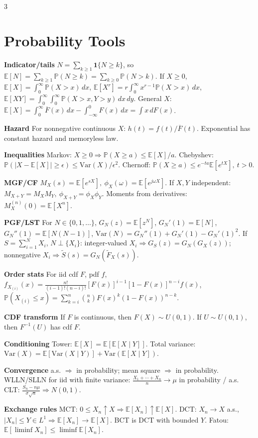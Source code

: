 \documentclass[a4paper,8pt,fleqn]{extarticle}
\newcommand{\E}{\mathbb{E}}
\newcommand{\PP}{\mathbb{P}}
\newcommand{\Var}{\mathrm{Var}}
\newcommand{\1}{\mathbf{1}}
\newcommand{\barF}{\overline{F}}
\newcommand{\sub}[1]{\textbf{#1} }
\begin{document}
\fontsize{5.12}{5.2}\selectfont
\begin{multicols}{3}

\section*{Probability Tools}
\sub{Indicator/tails} \(N=\sum_{k\ge1}\1\{N\ge k\}\), so \(\E[N]=\sum_{k\ge1}\PP(N\ge k)=\sum_{k\ge0}\PP(N>k)\). If \(X\ge0\), \(\E[X]=\int_0^\infty \PP(X>x)\,dx\), \(\E[X^r]=r\int_0^\infty x^{r-1}\PP(X>x)\,dx\), \(\E[XY]=\int_0^\infty\int_0^\infty \PP(X>x,Y>y)\,dx\,dy\). General \(X\): \(\E[X]=\int_0^\infty \barF(x)\,dx-\int_{-\infty}^0 F(x)\,dx=\int x\,dF(x)\).

\sub{Hazard} For nonnegative continuous \(X\): \(h(t)=f(t)/\barF(t)\). Exponential has constant hazard and memoryless law.

\sub{Inequalities} Markov: \(X\ge0\Rightarrow \PP(X\ge a)\le \E[X]/a\). Chebyshev: \(\PP(|X-\E[X]|\ge \epsilon)\le \Var(X)/\epsilon^2\). Chernoff: \(\PP(X\ge a)\le e^{-ta}\E[e^{tX}],\ t>0\).

\sub{MGF/CF} \(M_X(s)=\E[e^{sX}],\ \phi_X(\omega)=\E[e^{j\omega X}]\). If \(X,Y\) independent: \(M_{X+Y}=M_XM_Y,\ \phi_{X+Y}=\phi_X\phi_Y\). Moments from derivatives: \(M_X^{(n)}(0)=\E[X^n]\).

\sub{PGF/LST} For \(N\in\{0,1,\dots\}\), \(G_N(z)=\E[z^N]\), \(G_N'(1)=\E[N]\), \(G_N''(1)=\E[N(N-1)]\), \(\Var(N)=G_N''(1)+G_N'(1)-G_N'(1)^2\). If \(S=\sum_{i=1}^N X_i\), \(N\perp\{X_i\}\): integer-valued \(X_i\Rightarrow G_S(z)=G_N(G_X(z))\); nonnegative \(X_i\Rightarrow \tilde S(s)=G_N(\tilde F_X(s))\).

\sub{Order stats} For iid cdf \(F\), pdf \(f\), \(f_{X_{(i)}}(x)=\frac{n!}{(i-1)!(n-i)!}[F(x)]^{i-1}[1-F(x)]^{n-i}f(x)\), \(\PP(X_{(i)}\le x)=\sum_{k=i}^n \binom{n}{k}F(x)^k(1-F(x))^{n-k}\).

\sub{CDF transform} If \(F\) is continuous, then \(F(X)\sim U(0,1)\). If \(U\sim U(0,1)\), then \(F^{-1}(U)\) has cdf \(F\).

\sub{Conditioning} Tower: \(\E[X]=\E[\E[X\mid Y]]\). Total variance: \(\Var(X)=\E[\Var(X\mid Y)]+\Var(\E[X\mid Y])\).

\sub{Convergence} a.s. \(\Rightarrow\) in probability; mean square \(\Rightarrow\) in probability. WLLN/SLLN for iid with finite variance: \(\frac{X_1+\cdots+X_n}{n}\to \mu\) in probability / a.s. CLT: \(\frac{S_n-n\mu}{\sigma\sqrt n}\Rightarrow N(0,1)\).

\sub{Exchange rules} MCT: \(0\le X_n\uparrow X\Rightarrow \E[X_n]\uparrow \E[X]\). DCT: \(X_n\to X\) a.s., \(|X_n|\le Y\in L^1\Rightarrow \E[X_n]\to\E[X]\). BCT is DCT with bounded \(Y\). Fatou: \(\E[\liminf X_n]\le \liminf \E[X_n]\).


\end{multicols}
\end{document}
